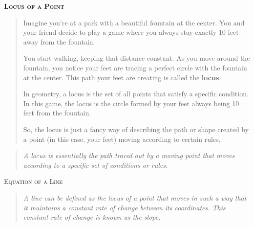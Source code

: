 \begin{center}
    \textsc{\Large\textbf{Locus of a Point}}
\end{center}

\begin{center}
\end{center}


\begin{quote}
    Imagine you're at a park with a beautiful fountain at the center. You and your friend decide to play a game where you always stay exactly 10 feet away from the fountain.

    You start walking, keeping that distance constant. As you move around the fountain, you notice your feet are tracing a perfect circle with the fountain at the center. This path your feet are creating is called the \textbf{locus}.

    In geometry, a locus is the set of all points that satisfy a specific condition. In this game, the locus is the circle formed by your feet always being 10 feet from the fountain.

    So, the locus is just a fancy way of describing the path or shape created by a point (in this case, your feet) moving according to certain rules.
\end{quote}

\begin{quote}
    \textit{
        A locus is essentially the path traced out by a moving point that moves according to a specific set of conditions or rules.
    }
\end{quote}

\vspace*{10mm}

\begin{center}
    \textsc{\large Equation of a Line}
\end{center}

\begin{quote}
    \textit{
        A line can be defined as the locus of a point that moves in such a way that it maintains a constant rate of change between its coordinates. This constant rate of change is known as the slope. \\[2mm]
    }
\end{quote}

